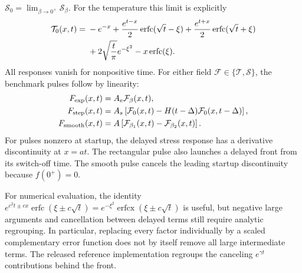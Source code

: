 \documentclass[11pt]{article}
\begin{document}
$\mathcal S_0=\lim_{\beta\to0^+}\mathcal S_\beta$.
For the temperature this limit is explicitly
\begin{align}
 \mathcal T_0(x,t)={}&-e^{-x}
 +\frac{e^{t-x}}2\operatorname{erfc}(\sqrt t-\xi)
 +\frac{e^{t+x}}2\operatorname{erfc}(\sqrt t+\xi)\notag\\
 &+2\sqrt{\frac t\pi}e^{-\xi^2}
 -x\operatorname{erfc}(\xi).
\end{align}
All responses vanish for nonpositive time. For either field
$\mathcal F\in\{\mathcal T,\mathcal S\}$, the benchmark pulses follow by
linearity:
\begin{align}
 F_{\rm exp}(x,t)&=A_e\mathcal F_\beta(x,t),\\
 F_{\rm step}(x,t)&=A_s\left[\mathcal F_0(x,t)
 -H(t-\Delta)\mathcal F_0(x,t-\Delta)\right],\\
 F_{\rm smooth}(x,t)&=A\left[\mathcal F_{\beta_1}(x,t)
 -\mathcal F_{\beta_2}(x,t)\right].
\end{align}
For pulses nonzero at startup, the delayed stress response has a derivative
discontinuity at $x=at$. The rectangular pulse also launches a delayed
front from its switch-off time. The smooth pulse cancels the leading
startup discontinuity because $f(0^+)=0$.

For numerical evaluation, the identity
$e^{c^2t\pm cx}\operatorname{erfc}(\xi\pm c\sqrt t)
=e^{-\xi^2}\operatorname{erfcx}(\xi\pm c\sqrt t)$
is useful, but negative large arguments and cancellation between delayed
terms still require analytic regrouping. In particular, replacing every
factor individually by a scaled complementary error function does not
by itself remove all large intermediate terms. The released reference
implementation regroups the canceling $e^{\gamma t}$
contributions behind the front.

\FloatBarrier


\end{document}

